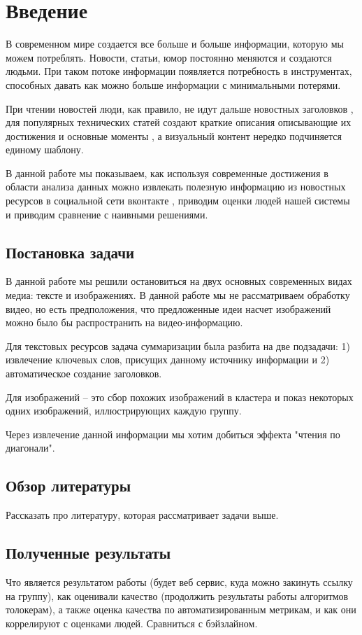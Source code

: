 \documentclass[aps,%
12pt,%
final,%
oneside,
onecolumn,%
musixtex, %
superscriptaddress,%
centertags]{article} %
\begin{document}
\section{Введение}
В современном мире создается все больше и больше информации, которую мы можем потреблять.
Новости, статьи, юмор постоянно меняются и создаются людьми. При таком потоке информации
появляется потребность в инструментах, способных давать как можно больше информации
с минимальными потерями.

При чтении новостей люди, как правило, не идут дальше новостных заголовков \cite{jaysondemers2016},
для популярных технических статей создают краткие описания описывающие их достижения
и основные моменты \cite{tldr_arxiv2019, articleessence2019}, а визуальный контент нередко подчиняется единому шаблону.

В данной работе мы показываем, как используя современные достижения в области анализа
данных можно извлекать полезную информацию из новостных ресурсов в социальной сети вконтакте \cite{vk2019},
приводим оценки людей нашей системы и приводим сравнение с наивными решениями.

\subsection{Постановка задачи}
В данной работе мы решили остановиться на двух основных современных видах медиа: тексте и
изображениях. В данной работе мы не рассматриваем обработку видео, но есть предположения,
что предложенные идеи насчет изображений можно было бы распространить на видео-информацию.

Для текстовых ресурсов задача суммаризации была разбита на две подзадачи: 1) извлечение
ключевых слов, присущих данному источнику информации и 2) автоматическое создание заголовков.

Для изображений -- это сбор похожих изображений в кластера и показ некоторых
одних изображений, иллюстрирующих каждую группу.

Через извлечение данной информации мы хотим добиться эффекта "чтения по диагонали".
\subsection{Обзор литературы}
Рассказать про литературу, которая рассматривает задачи выше.
\subsection{Полученные результаты}
Что является результатом работы (будет веб сервис, куда можно закинуть ссылку на группу),
как оценивали качество (продолжить результаты работы алгоритмов толокерам), а также
оценка качества по автоматизированным метрикам, и как они коррелируют с оценками людей.
Сравниться с бэйзлайном.
\end{document}
